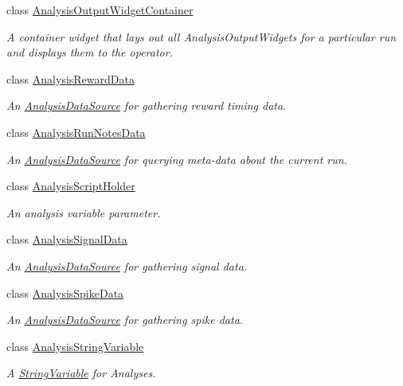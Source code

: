 \begin{DoxyCompactItemize}
class \hyperlink{class_picto_1_1_analysis_output_widget_container}{Analysis\-Output\-Widget\-Container}
\begin{DoxyCompactList}\small\item\em A container widget that lays out all Analysis\-Output\-Widgets for a particular run and displays them to the operator. \end{DoxyCompactList}\item 
class \hyperlink{class_picto_1_1_analysis_reward_data}{Analysis\-Reward\-Data}
\begin{DoxyCompactList}\small\item\em An \hyperlink{class_picto_1_1_analysis_data_source}{Analysis\-Data\-Source} for gathering reward timing data. \end{DoxyCompactList}\item 
class \hyperlink{class_picto_1_1_analysis_run_notes_data}{Analysis\-Run\-Notes\-Data}
\begin{DoxyCompactList}\small\item\em An \hyperlink{class_picto_1_1_analysis_data_source}{Analysis\-Data\-Source} for querying meta-\/data about the current run. \end{DoxyCompactList}\item 
class \hyperlink{class_picto_1_1_analysis_script_holder}{Analysis\-Script\-Holder}
\begin{DoxyCompactList}\small\item\em An analysis variable parameter. \end{DoxyCompactList}\item 
class \hyperlink{class_picto_1_1_analysis_signal_data}{Analysis\-Signal\-Data}
\begin{DoxyCompactList}\small\item\em An \hyperlink{class_picto_1_1_analysis_data_source}{Analysis\-Data\-Source} for gathering signal data. \end{DoxyCompactList}\item 
class \hyperlink{class_picto_1_1_analysis_spike_data}{Analysis\-Spike\-Data}
\begin{DoxyCompactList}\small\item\em An \hyperlink{class_picto_1_1_analysis_data_source}{Analysis\-Data\-Source} for gathering spike data. \end{DoxyCompactList}\item 
class \hyperlink{class_picto_1_1_analysis_string_variable}{Analysis\-String\-Variable}
\begin{DoxyCompactList}\small\item\em A \hyperlink{class_picto_1_1_string_variable}{String\-Variable} for Analyses. \end{DoxyCompactList}\item 

\end{DoxyCompactItemize}
